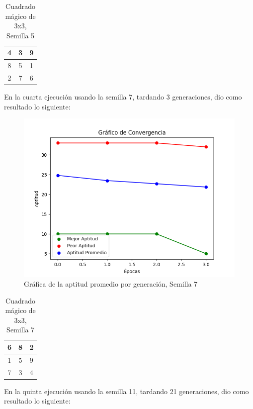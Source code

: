 \documentclass{report}
\begin{document}
    \begin{table}[H]
        \centering
        \begin{tabular}{|c|c|c|}
            \hline
            4 & 3 & 9\\
            \hline
            8 & 5 & 1\\
            \hline
            2 & 7 & 6\\
            \hline
        \end{tabular}
        \caption{Cuadrado mágico de 3x3, Semilla 5}
    \end{table}
    En la cuarta ejecución usando la semilla 7, tardando 3 generaciones, dio como resultado lo siguiente:
    \begin{figure}[H]
        \centering
        \includegraphics[scale=0.5]{Grafica4.png}
        \caption{Gráfica de la aptitud promedio por generación, Semilla 7}
    \end{figure}
    \begin{table}[H]
        \centering
        \begin{tabular}{|c|c|c|}
            \hline
            6 & 8 & 2\\
            \hline
            1 & 5 & 9\\
            \hline
            7 & 3 & 4\\
            \hline
        \end{tabular}
        \caption{Cuadrado mágico de 3x3, Semilla 7}
    \end{table}
    En la quinta ejecución usando la semilla 11, tardando 21 generaciones, dio como resultado lo siguiente:
\end{document}
